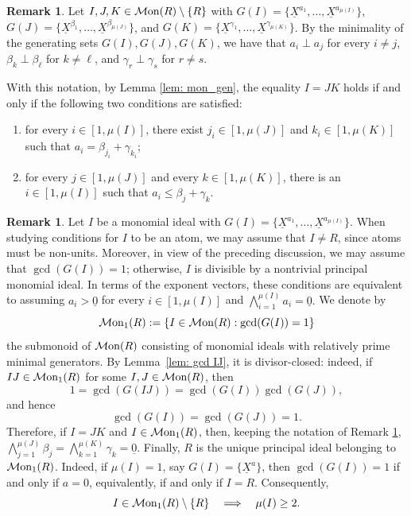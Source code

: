 \documentclass[a4paper,10pt,reqno]{amsart}
\theoremstyle{definition}
\theoremstyle{definition}
\newtheorem{remark}[theorem]{Remark}
\providecommand\Mon{{\mathcal{M}{\rm on}}}
\begin{document}
\begin{remark}\label{rem: E1 E2}
    Let $I,J,K\in\Mon(R)\setminus\{R\}$ with $G(I) = \{\underline X^{a_1},\dots,\underline X^{a_{\mu(I)}}\}$, $G(J) = \{ \underline X^{\beta_1},\dots,\underline X^{\beta_{\mu(J)}} \}$, and $G(K) = \{ \underline X^{\gamma_1},\dots,\underline X^{\gamma_{\mu(K)}} \}$. By the minimality of the generating sets $G(I),G(J),G(K)$, we have that $a_i\perp a_j$ for every $i\neq j$, $\beta_k\perp\beta_\ell$ for $k\neq \ell$, and $\gamma_r\perp\gamma_s$ for $r\neq s$.

    With this notation, by Lemma \ref{lem: mon_gen}, the equality $I=JK$ holds if and only if the following two conditions are satisfied:
    \begin{enumerate}[label=\textup{\bf(E\arabic{*})}, mode=unboxed]
        \item\label{eq: I in JK} for every $i\in [1,\mu(I)]$, there exist $j_i\in [1,\mu(J)]$ and $k_i\in [1,\mu(K)]$ such that $a_i = \beta_{j_i}+\gamma_{k_i}$;
        \item\label{eq: JK in I} for every $j\in [1,\mu(J)]$ and every $k\in [1,\mu(K)]$, there is an $i\in [1,\mu(I)]$ such that $a_i \le \beta_j+\gamma_k$.
    \end{enumerate}
\end{remark}

\begin{remark}\label{rem: mon1 R}
    Let $I$ be a monomial ideal with $G(I) = \{\underline X^{a_1},\dots,\underline X^{a_{\mu(I)}}\}$. When studying conditions for $I$ to be an atom, we may assume that $I\neq R$, since atoms must be non-units. Moreover, in view of the preceding discussion, we may assume that $\gcd(G(I))=1$; otherwise, $I$ is divisible by a nontrivial principal monomial ideal. In terms of the exponent vectors, these conditions are equivalent to assuming $a_i> \underline 0$ for every $i\in [1,\mu(I)]$ and $\bigwedge_{i=1}^{\mu(I)}a_i=\underline 0.$ We denote by
    \[
        \Mon_1(R):=
        \{I\in\Mon(R):\gcd(G(I))=1\}
    \]
    the submonoid of $\Mon(R)$ consisting of monomial ideals with relatively prime minimal generators. By Lemma~\ref{lem: gcd IJ}, it is divisor-closed: indeed, if $IJ\in\Mon_1(R)$ for some $I,J\in\Mon(R)$, then
    \[
        1=\gcd(G(IJ))=\gcd(G(I))\gcd(G(J)),
    \]
    and hence
    \[
        \gcd(G(I))=\gcd(G(J))=1.
    \]
    Therefore, if $I=JK$ and $I\in\Mon_1(R)$, then, keeping the notation of Remark \ref{rem: E1 E2}, $\bigwedge_{j=1}^{\mu(J)} \beta_j = \bigwedge_{k=1}^{\mu(K)} \gamma_k = \underline 0$.
    Finally, $R$ is the unique principal ideal belonging to $\Mon_1(R)$.
    Indeed, if $\mu(I)=1$, say $G(I)=\{\underline X^{a}\}$, then $\gcd(G(I))=1$ if and only if $a=0$, equivalently, if and only if $I=R$. Consequently,
    \[
        I\in\Mon_1(R)\setminus\{R\}
        \quad\Longrightarrow\quad
        \mu(I)\ge 2.
    \]
\end{remark}
\end{document}
